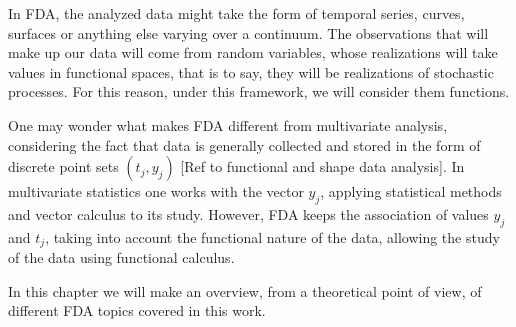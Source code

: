In FDA, the analyzed data might take the form of temporal series, curves, surfaces or anything else varying over a continuum.  The observations that will make up our data will come from random variables, whose realizations will take values in functional spaces, that is to say, they will be realizations of stochastic processes. For this reason, under this framework, we will consider them functions.

One may wonder what makes FDA different from multivariate analysis, considering the fact that data is generally collected and stored in the form of discrete point sets ${(t_j, y_j)}$ [Ref to functional and shape data analysis].  In multivariate statistics one works with the vector ${y_j}$, applying statistical methods and vector calculus to its study. However, FDA keeps the association of values ${y_j}$ and ${t_j}$, taking into account the functional nature of the data, allowing the study of the data using functional calculus.

In this chapter we will make an overview, from a theoretical point of view, of different FDA topics covered in this work.
